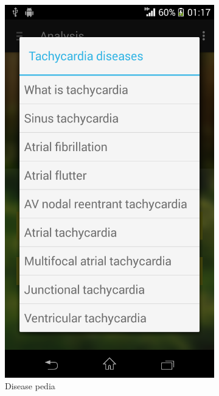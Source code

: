 \begin{figure}
\begin{subfigure}{.24\textwidth}
  \includegraphics[width=.8\linewidth]{img/screenshot/ss12.png}
  \caption{Disease pedia}
\end{subfigure}
\begin{subfigure}{.24\textwidth}
  \centering

\end{subfigure}
\end{figure}
